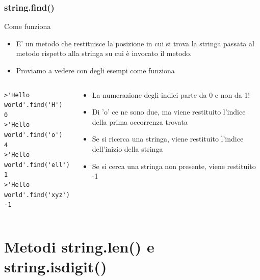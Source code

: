 \documentclass{beamer}
\begin{document}
\begin{frame}[fragile]
\frametitle{string.find()}
\begin{block}{Come funziona}
	\begin{itemize}
		\item E' un metodo che restituisce la posizione in cui si trova la stringa passata al metodo rispetto alla stringa su cui è invocato il metodo.
		\item Proviamo a vedere con degli esempi come funziona
	\end{itemize}
\end{block}
\begin{columns}
	\begin{column}[T]{0.53\textwidth}
		\begin{lstlisting}
>'Hello world'.find('H')
0
>'Hello world'.find('o')
4
>'Hello world'.find('ell')
1
>'Hello world'.find('xyz')
-1
		\end{lstlisting}
	\end{column}
	\begin{column}[T]{0.47\textwidth}
		\begin{itemize}
			\item La numerazione degli indici parte da 0 e non da 1!
			\item Di 'o' ce ne sono due, ma viene restituito l'indice della prima occorrenza trovata
			\item Se si ricerca una stringa, viene restituito l'indice dell'inizio della stringa
			\item Se si cerca una stringa non presente, viene restituito -1
		\end{itemize}
	\end{column}
\end{columns}

\end{frame}

\section{Metodi string.len() e string.isdigit()}
\end{document}
